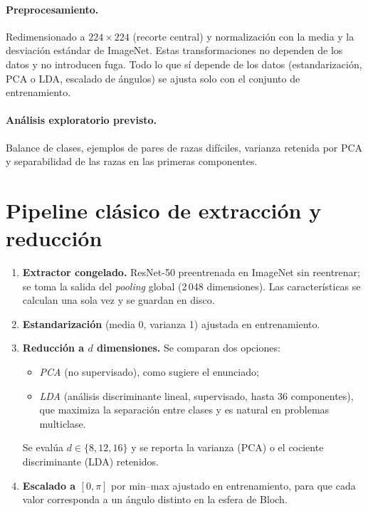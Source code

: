 \documentclass[11pt,letterpaper]{article}
\begin{document}
\paragraph{Preprocesamiento.} Redimensionado a $224\times224$ (recorte central) y normalización con
la media y la desviación estándar de ImageNet. Estas transformaciones no dependen de los datos y no
introducen fuga. Todo lo que sí depende de los datos (estandarización, PCA o LDA, escalado de ángulos)
se ajusta solo con el conjunto de entrenamiento.

\paragraph{Análisis exploratorio previsto.} Balance de clases, ejemplos de pares de razas difíciles,
varianza retenida por PCA y separabilidad de las razas en las primeras componentes.

\section{Pipeline clásico de extracción y reducción}
\begin{enumerate}[leftmargin=*]
\item \textbf{Extractor congelado.} ResNet-50 preentrenada en ImageNet \cite{he2016} sin reentrenar;
se toma la salida del \emph{pooling} global (2\,048 dimensiones). Las características se calculan una
sola vez y se guardan en disco.
\item \textbf{Estandarización} (media 0, varianza 1) ajustada en entrenamiento.
\item \textbf{Reducción a $d$ dimensiones.} Se comparan dos opciones:
  \begin{itemize}
  \item \emph{PCA} (no supervisado), como sugiere el enunciado;
  \item \emph{LDA} (análisis discriminante lineal, supervisado, hasta 36 componentes), que maximiza
  la separación entre clases y es natural en problemas multiclase.
  \end{itemize}
  Se evalúa $d\in\{8,12,16\}$ y se reporta la varianza (PCA) o el cociente discriminante (LDA) retenidos.
\item \textbf{Escalado a $[0,\pi]$} por min--max ajustado en entrenamiento, para que cada valor
corresponda a un ángulo distinto en la esfera de Bloch.
\end{enumerate}
\end{document}
